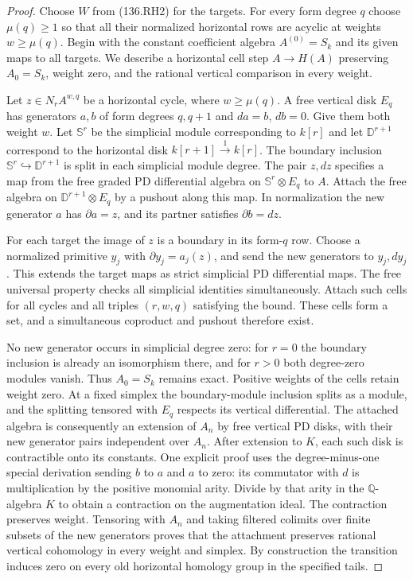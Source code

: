 \begin{proof}
Choose $W$ from (136.RH2) for the targets. For every form degree
$q$ choose $\mu(q)\ge1$ so that all their normalized horizontal
rows are acyclic at weights $w\ge\mu(q)$.
Begin with the constant coefficient algebra $A^{(0)}=S_k$
and its given maps to all targets. We describe a horizontal
cell step $A\to H(A)$ preserving $A_0=S_k$, weight zero,
and the rational vertical comparison in every weight.

Let $z\in N_r A^{w,q}$ be a horizontal cycle, where
$w\ge\mu(q)$. A free vertical disk $E_q$ has generators
$a,b$ of form degrees $q,q+1$ and $da=b$, $db=0$.
Give them both weight $w$. Let $\mathbb S^r$ be the
simplicial module corresponding to $k[r]$ and let
$\mathbb D^{r+1}$ correspond to the horizontal disk
$k[r+1]\xrightarrow{1}k[r]$. The boundary inclusion
$\mathbb S^r\hookrightarrow\mathbb D^{r+1}$ is split in
each simplicial module degree. The pair $z,dz$ specifies a
map from the free graded PD differential algebra on
$\mathbb S^r\otimes E_q$ to $A$. Attach the free algebra on
$\mathbb D^{r+1}\otimes E_q$ by a pushout along this map.
In normalization the new generator $a$ has
$\partial a=z$, and its partner satisfies
$\partial b=dz$.

For each target the image of $z$ is a boundary in its form-$q$
row. Choose a normalized primitive $y_j$ with
$\partial y_j=a_j(z)$, and send the new generators to
$y_j,dy_j$. This extends the target maps as strict simplicial
PD differential maps. The free universal property checks all
simplicial identities simultaneously. Attach such cells for
all cycles and all triples $(r,w,q)$ satisfying the bound.
These cells form a set, and a simultaneous coproduct and
pushout therefore exist.

No new generator occurs in simplicial degree zero: for $r=0$
the boundary inclusion is already an isomorphism there, and
for $r>0$ both degree-zero modules vanish. Thus $A_0=S_k$
remains exact. Positive weights of the cells retain weight zero.
At a fixed simplex the boundary-module inclusion splits as a
module, and the splitting tensored with $E_q$ respects its
vertical differential. The attached algebra is consequently
an extension of $A_n$ by free vertical PD disks, with their
new generator pairs independent over $A_n$.
After extension to $K$, each such disk is contractible onto
its constants. One explicit proof uses the degree-minus-one
special derivation sending $b$ to $a$ and $a$ to zero:
its commutator with $d$ is multiplication by the positive
monomial arity. Divide by that arity in the $\mathbb Q$-algebra
$K$ to obtain a contraction on the augmentation ideal.
The contraction preserves weight. Tensoring with $A_n$
and taking filtered colimits over finite subsets of the new
generators proves that the attachment preserves rational
vertical cohomology in every weight and simplex.
By construction the transition induces zero on every old
horizontal homology group in the specified tails.


\end{proof}
